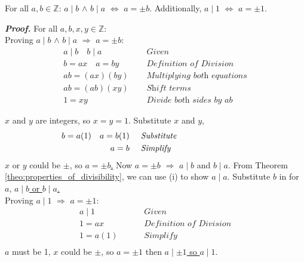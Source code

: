 \newpage

\begin {theo}

\label{theo:reflexive_divisibility}

For all $a, b \in \mathbb{Z}$: $a \mid b$ $\land$ $b \mid a$ $\Longleftrightarrow$ $a = \pm b$. Additionally, $a \mid 1$ $\Longleftrightarrow$ $a = \pm 1$.
\end{theo}

\begin{Proof}

    \label{proof:reflexive_divisibility}

    \textit{\textbf{Proof.}} For all $a, b, x,y \in \mathbb{Z}$:\\

    \noindent
    Proving $a\mid b$ $\land$ $b\mid a$ $\Longrightarrow$ $a = \pm b$:
    \begin{align*}
        a\mid b \quad b\mid a \quad \quad & \textit{ Given}                      \\
        b = ax \quad a = by         \quad & \textit{ Definition of Division}     \\
        ab = (ax) (by)              \quad & \textit{ Multiplying both equations} \\
        ab = (ab)(xy)               \quad & \textit{ Shift terms}                \\
        1 = xy                      \quad & \textit{ Divide both sides by } ab
    \end{align*}

    \noindent
    $x$ and $y$ are integers, so $x = y = 1$. Substitute $x$ and $y$,
    \hspace{-3em}
    \begin{align*}
        b = a(1) \quad a = b(1) \quad & \textit{ Substitute}              \\
        a = b \quad                   & \textit{ Simplify } \hspace*{9em}
    \end{align*}
    $x$ or $y$ could be $\pm$, so \underline{$a = \pm b$.} Now $a=\pm b$ $\Longrightarrow$ $a\mid b$ and $b\mid a$.
    From Theorem \autoref{theo:properties_of_divisibility}, we can use (i) to show $a\mid a$. Substitute $b$ in for $a$, \underline{$a\mid b$ or $b\mid a$.}\\

    \noindent
    Proving $a\mid 1$ $\Longrightarrow$ $a = \pm 1$:
    \begin{align*}
        a\mid 1 \quad \quad  & \textit{ Given}                  \\
        1 = ax \quad \quad   & \textit{ Definition of Division} \\
        1 = a(1) \quad \quad & \textit{ Simplify}               \\
    \end{align*}
    $a$ must be 1, $x$ could be $\pm$, so $a = \pm 1$ then \underline{$a\mid \pm 1$ so $a\mid 1$}.
\end{Proof}

